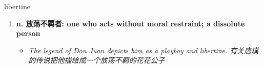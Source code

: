 
\begin{frame}
{\huge libertine}
\begin{center}
\begin{enumerate}\Large
  \item \textbf{n. 放荡不羁者: one who acts without moral restraint; a dissolute person}
  \begin{itemize}
    \item \em{\Large{The legend of Don Juan depicts him as a playboy and libertine. 有关唐璜的传说把他描绘成一个放荡不羁的花花公子}}
  \end{itemize}
\end{enumerate}
\end{center}
\end{frame}
